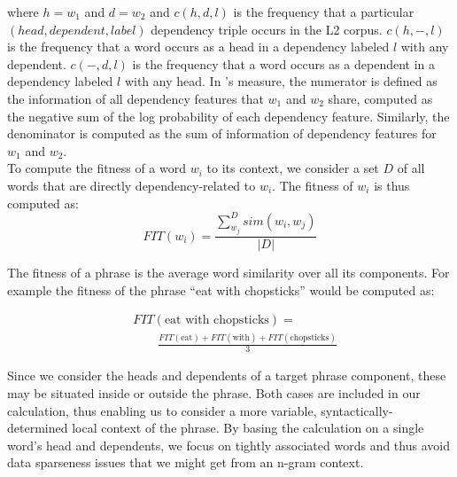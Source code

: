 \documentclass[11pt]{article}
\begin{document}
\noindent
where $h=w_1$ and $d=w_2$ and 
$c(h,d,l)$ is the frequency that a particular $(head, dependent, label)$ dependency triple occurs in the L2 corpus. $c(h,-,l)$ is the frequency that a word occurs as a head in a dependency labeled $l$ with any dependent. $c(-,d,l)$ is the frequency that a word occurs as a dependent in a dependency labeled $l$  with any head. 
In \cite{lin:98}'s measure, the numerator is defined as the information of all dependency features that $w_1$ and $w_2$ share, computed as the negative sum of the log probability of each dependency feature. Similarly, the denominator is computed as the sum of information of dependency features for $w_1$ and $w_2$. \\

To compute the fitness of a word $w_i$ to its context, we consider a set $D$ of all words that are directly dependency-related to $w_i$. The fitness of $w_i$ is thus computed as:\\
\begin{equation}
FIT(w_i) =  \frac {  \sum_{w_j}^{D} sim(w_i,w_j) } {  |D|}
\end{equation}

The fitness of a phrase is the average word similarity over all its components. For example the fitness of the phrase ``eat with chopsticks'' would be computed as:

\begin{align}
& FIT(\mbox{eat with chopsticks}) = \nonumber \\
 & \qquad \frac{FIT(\mbox{eat}) + FIT(\mbox{with}) + FIT(\mbox{chopsticks})}{3}
\end{align}

Since we consider the heads and dependents of a target phrase component, these may be situated  inside or outside the phrase. Both cases are included in our calculation, thus enabling us to consider a more variable, syntactically-determined local context of the phrase.
By basing the calculation on a single word's head and dependents, we focus on tightly associated words and thus avoid data sparseness issues that we might get from an n-gram context.
\end{document}
